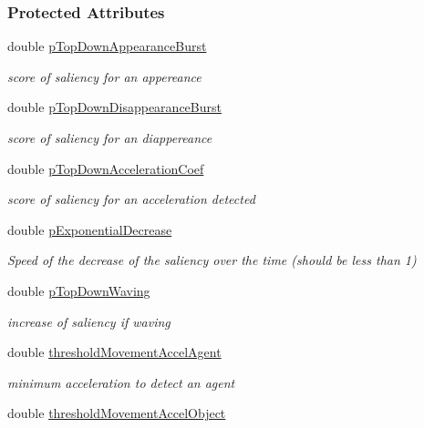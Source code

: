 \subsubsection*{Protected Attributes}
\begin{DoxyCompactItemize}
\item 
double \hyperlink{group__pasar_a036e6eefa05f5d54c446b410a20dad94}{p\+Top\+Down\+Appearance\+Burst}
\begin{DoxyCompactList}\small\item\em score of saliency for an appereance \end{DoxyCompactList}\item 
double \hyperlink{group__pasar_a1ffee40c8bbcbeab1e4a3e06fcb69f74}{p\+Top\+Down\+Disappearance\+Burst}
\begin{DoxyCompactList}\small\item\em score of saliency for an diappereance \end{DoxyCompactList}\item 
double \hyperlink{group__pasar_a6cd0031d0976255163c72374d085cd68}{p\+Top\+Down\+Acceleration\+Coef}
\begin{DoxyCompactList}\small\item\em score of saliency for an acceleration detected \end{DoxyCompactList}\item 
double \hyperlink{group__pasar_a911cdea1fc39d0c2e1dc30fa8b29f10b}{p\+Exponential\+Decrease}
\begin{DoxyCompactList}\small\item\em Speed of the decrease of the saliency over the time (should be less than 1) \end{DoxyCompactList}\item 
double \hyperlink{group__pasar_a8ac28563deb0e11e7389023ed3e7af83}{p\+Top\+Down\+Waving}
\begin{DoxyCompactList}\small\item\em increase of saliency if waving \end{DoxyCompactList}\item 
double \hyperlink{group__pasar_a21daf3a3c5d5b52887083f56a5370262}{threshold\+Movement\+Accel\+Agent}
\begin{DoxyCompactList}\small\item\em minimum acceleration to detect an agent \end{DoxyCompactList}\item 
double \hyperlink{group__pasar_aaee66528c2e631dda1539ac530092229}{threshold\+Movement\+Accel\+Object}

\end{DoxyCompactItemize}
